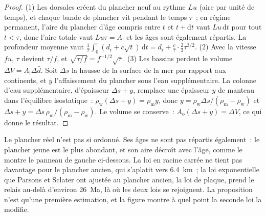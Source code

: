 \begin{proof}
(1) Les dorsales créent du plancher neuf au rythme $Lu$ (aire par unité de temps), et chaque bande de plancher vit pendant
le temps $\tau$~; en régime permanent, l'aire du plancher d'âge compris entre $t$ et $t + \mathrm{d}t$
vaut $Lu\,\mathrm{d}t$ pour tout $t < \tau$, donc l'aire totale vaut $Lu\tau = A_{\text{f}}$ et les âges sont
également répartis. La profondeur moyenne vaut
$\frac1\tau\int_0^\tau (d_{\text{r}} + c\sqrt t)\,\mathrm{d}t = d_{\text{r}} + \frac{c}{\tau}
\cdot\frac23\tau^{3/2}$. (2) Avec la vitesse $fu$, $\tau$ devient $\tau/f$, et
$\sqrt{\tau/f} = f^{-1/2}\sqrt\tau$. (3) Les bassins perdent le volume $\Delta V = A_{\text{f}}
\Delta\bar d$. Soit $\Delta s$ la hausse de la surface de la mer par rapport aux continents, et $y$ l'affaissement du plancher
sous l'eau supplémentaire. La colonne d'eau supplémentaire, d'épaisseur $\Delta s + y$, remplace une
épaisseur $y$ de manteau dans l'équilibre isostatique~: $\rho_{\text{w}}(\Delta s + y) =
\rho_{\text{m}} y$, donc $y = \rho_{\text{w}}\Delta s/(\rho_{\text{m}} - \rho_{\text{w}})$ et
$\Delta s + y = \Delta s\,\rho_{\text{m}}/(\rho_{\text{m}} - \rho_{\text{w}})$. Le volume se conserve~:
$A_{\text{o}}(\Delta s + y) = \Delta V$, ce qui donne le résultat.
\end{proof}

Le plancher réel n'est pas si ordonné. Ses âges ne sont pas répartis également~: le plancher jeune
est le plus abondant, et son aire décroît avec l'âge, comme le montre le panneau de gauche ci-dessous.
La loi en racine carrée ne tient pas davantage pour le plancher ancien, qui s'aplatit vers
\qty{6.4}{km}~; la loi exponentielle que Parsons et Sclater ont ajustée au plancher ancien, la loi de
plaque, prend le relais au-delà d'environ \qty{26}{Ma}, là où les deux lois se rejoignent. La proposition
n'est qu'une première estimation, et la figure montre à quel point la seconde loi la modifie.

